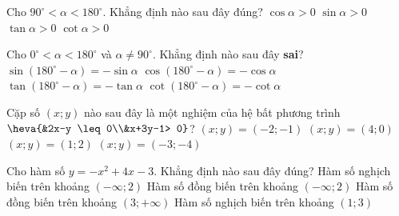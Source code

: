 \begin{ex}%
	Cho $90^{\circ} < \alpha < 180^{\circ}$. Khẳng định nào sau đây đúng?
	\choice
	{$\cos \alpha > 0$}
	{\True $\sin \alpha > 0$}
	{$\tan \alpha > 0$}
	{$\cot \alpha > 0$}
\end{ex}
\begin{ex}%
	Cho $0^{\circ} < \alpha < 180^{\circ}$ và $\alpha \neq 90^{\circ}$. Khẳng định nào sau đây \textbf{sai}?
	\choice
	{\True $\sin \left(180^{\circ}-\alpha\right)=-\sin \alpha$}
	{$\cos \left(180^{\circ}-\alpha\right)=-\cos \alpha$}
	{$\tan \left(180^{\circ}-\alpha\right)=-\tan \alpha$}
	{$\cot \left(180^{\circ}-\alpha\right)=-\cot \alpha$}
\end{ex}
\begin{ex}%
	Cặp số $(x; y)$ nào sau đây là một nghiệm của hệ bất phương trình $\heva{&2x-y \leq 0\\&x+3y-1> 0}$?
	\choice
	{$(x; y)=(-2;-1)$}
	{$(x; y)=(4; 0)$}
	{\True $(x; y)=(1; 2)$}
	{$(x; y)=(-3;-4)$}
\end{ex}
\begin{ex}%
	Cho hàm số $y=-x^2+4x-3$. Khẳng định nào sau đây đúng?
	\choice
	{Hàm số nghịch biến trên khoảng $(-\infty; 2)$}
	{\True Hàm số đồng biến trên khoảng $(-\infty; 2)$}
	{Hàm số đồng biến trên khoảng $(3;+\infty)$}
	{Hàm số nghịch biến trên khoảng $(1; 3)$}
\end{ex}

